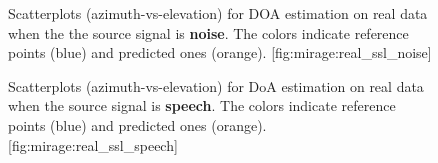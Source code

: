 \begin{figure}[h]
    \begin{sidecaption}[]{
        Scatterplots (azimuth-vs-elevation) for DOA estimation on real data when the the source signal is \textbf{noise}.
        The colors indicate reference points (blue) and predicted ones (orange).
    }[fig:mirage:real_ssl_noise]
    \centering
    \hfill
    \end{sidecaption}
\end{figure}

\begin{figure}[h]
    \begin{sidecaption}[]{
        Scatterplots (azimuth-vs-elevation) for DoA estimation on real data when the source signal is \textbf{speech}.
        The colors indicate reference points (blue) and predicted ones (orange).
    }[fig:mirage:real_ssl_speech]
    \centering
    \hfill
    \end{sidecaption}
\end{figure}


